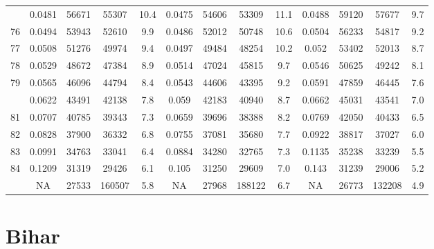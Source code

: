 \documentclass[
  14pt,
]{article}
\begin{document}
\begin{longtable}[t]{lcccccccccccc}
\addlinespace
75 & 0.0481 & 56671 & 55307 & 10.4 & 0.0475 & 54606 & 53309 & 11.1 & 0.0488 & 59120 & 57677 & 9.7\\
76 & 0.0494 & 53943 & 52610 & 9.9 & 0.0486 & 52012 & 50748 & 10.6 & 0.0504 & 56233 & 54817 & 9.2\\
77 & 0.0508 & 51276 & 49974 & 9.4 & 0.0497 & 49484 & 48254 & 10.2 & 0.052 & 53402 & 52013 & 8.7\\
78 & 0.0529 & 48672 & 47384 & 8.9 & 0.0514 & 47024 & 45815 & 9.7 & 0.0546 & 50625 & 49242 & 8.1\\
79 & 0.0565 & 46096 & 44794 & 8.4 & 0.0543 & 44606 & 43395 & 9.2 & 0.0591 & 47859 & 46445 & 7.6\\
\addlinespace
80 & 0.0622 & 43491 & 42138 & 7.8 & 0.059 & 42183 & 40940 & 8.7 & 0.0662 & 45031 & 43541 & 7.0\\
81 & 0.0707 & 40785 & 39343 & 7.3 & 0.0659 & 39696 & 38388 & 8.2 & 0.0769 & 42050 & 40433 & 6.5\\
82 & 0.0828 & 37900 & 36332 & 6.8 & 0.0755 & 37081 & 35680 & 7.7 & 0.0922 & 38817 & 37027 & 6.0\\
83 & 0.0991 & 34763 & 33041 & 6.4 & 0.0884 & 34280 & 32765 & 7.3 & 0.1135 & 35238 & 33239 & 5.5\\
84 & 0.1209 & 31319 & 29426 & 6.1 & 0.105 & 31250 & 29609 & 7.0 & 0.143 & 31239 & 29006 & 5.2\\
\addlinespace
85 & NA & 27533 & 160507 & 5.8 & NA & 27968 & 188122 & 6.7 & NA & 26773 & 132208 & 4.9\\*
\end{longtable}

\pagebreak

\hypertarget{bihar}{%
\section{Bihar}\label{bihar}}
\end{document}
